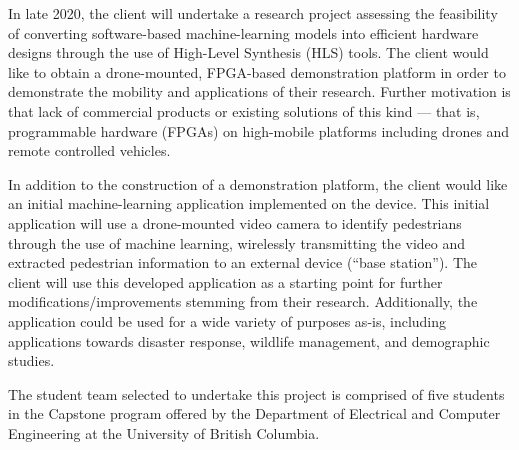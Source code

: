 In late 2020, the client will undertake a research project assessing the feasibility of converting software-based machine-learning models into efficient hardware designs through the use of High-Level Synthesis (HLS) tools. The client would like to obtain a drone-mounted, FPGA-based demonstration platform in order to demonstrate the mobility and applications of their research. Further motivation is that lack of commercial products or existing solutions of this kind --- that is, programmable hardware (FPGAs) on high-mobile platforms including drones and remote controlled vehicles.

In addition to the construction of a demonstration platform, the client would like an initial machine-learning application implemented on the device. This initial application will use a drone-mounted video camera to identify pedestrians through the use of machine learning, wirelessly transmitting the video and extracted pedestrian information to an external device (``base station''). The client will use this developed application as a starting point for further modifications/improvements stemming from their research. Additionally, the application could be used for a wide variety of purposes as-is, including applications towards disaster response, wildlife management, and demographic studies.

The student team selected to undertake this project is comprised of five students in the Capstone program offered by the Department of Electrical and Computer Engineering at the University of British Columbia.
